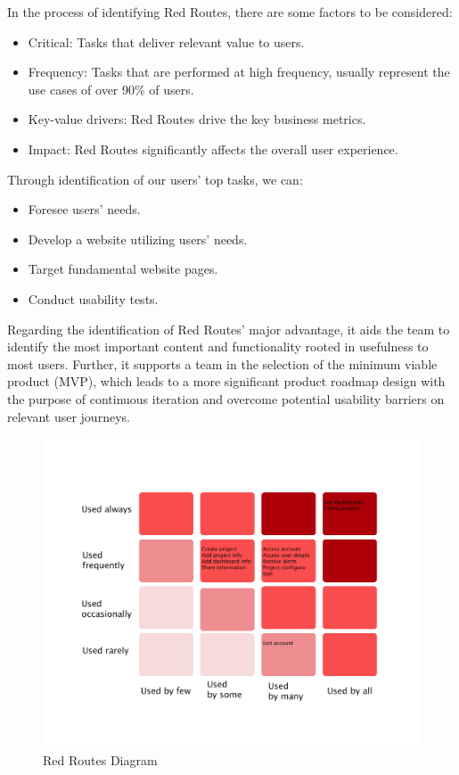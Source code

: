 \documentclass[a4paper,twoside,10pt]{report}
\begin{document}
In the process of identifying Red Routes, there are some factors to be considered:
\begin{itemize}
	\item Critical: Tasks that deliver relevant value to users.
 	\item Frequency: Tasks that are performed at high frequency, usually represent the use cases of over 90\% of users.
 	\item Key-value drivers: Red Routes drive the key business metrics.
 	\item Impact: Red Routes significantly affects the overall user experience.
\end{itemize}
Through identification of our users' top tasks, we can:
\begin{itemize}
	\item Foresee users' needs.
	\item Develop a website utilizing users' needs.
	\item Target fundamental website pages.
	\item Conduct usability tests.
\end{itemize}	
Regarding the identification of Red Routes' major advantage, it aids the team to identify the most important content and functionality rooted in usefulness to most users. Further, it supports a team in the selection of the minimum viable product (MVP), which leads to a more significant product roadmap design with the purpose of continuous iteration and overcome potential usability barriers on relevant user journeys. 
\begin{figure}[h!]
\center
  \includegraphics[width=\textwidth]{red-routes.png}
\caption{Red Routes Diagram}
\end{figure}
\end{document}
